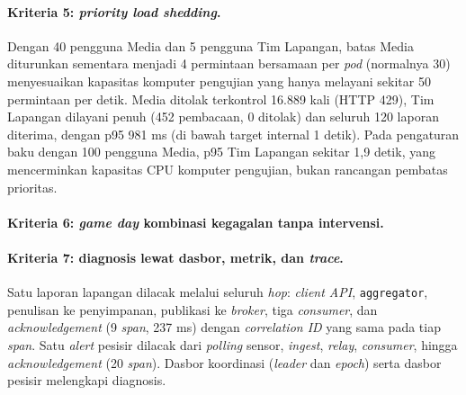 \paragraph*{Kriteria 5: \textit{priority load shedding}.}
Dengan 40 pengguna Media dan 5 pengguna Tim Lapangan, batas Media diturunkan sementara menjadi 4 permintaan bersamaan per \textit{pod} (normalnya 30) menyesuaikan kapasitas komputer pengujian yang hanya melayani sekitar 50 permintaan per detik. Media ditolak terkontrol 16.889 kali (HTTP 429), Tim Lapangan dilayani penuh (452 pembacaan, 0 ditolak) dan seluruh 120 laporan diterima, dengan p95 981 ms (di bawah target internal 1 detik). Pada pengaturan baku dengan 100 pengguna Media, p95 Tim Lapangan sekitar 1,9 detik, yang mencerminkan kapasitas CPU komputer pengujian, bukan rancangan pembatas prioritas.

\paragraph*{Kriteria 6: \textit{game day} kombinasi kegagalan tanpa intervensi.}

\paragraph*{Kriteria 7: diagnosis lewat dasbor, metrik, dan \textit{trace}.}
Satu laporan lapangan dilacak melalui seluruh \textit{hop}: \textit{client API}, \texttt{aggregator}, penulisan ke penyimpanan, publikasi ke \textit{broker}, tiga \textit{consumer}, dan \textit{acknowledgement} (9 \textit{span}, 237 ms) dengan \textit{correlation ID} yang sama pada tiap \textit{span}. Satu \textit{alert} pesisir dilacak dari \textit{polling} sensor, \textit{ingest}, \textit{relay}, \textit{consumer}, hingga \textit{acknowledgement} (20 \textit{span}). Dasbor koordinasi (\textit{leader} dan \textit{epoch}) serta dasbor pesisir melengkapi diagnosis.

